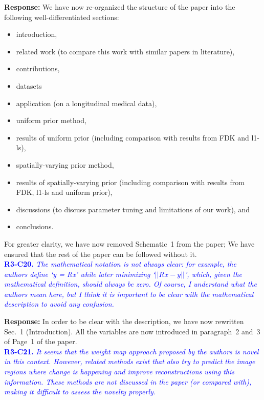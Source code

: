 \documentclass{article}
\begin{document}
\textbf{Response:} We have now re-organized the structure of the paper into the following well-differentiated sections:
\begin{itemize}
  
\item introduction, 
\item related work (to compare this work with similar papers in literature), 
\item contributions,
\item datasets
\item application (on a longitudinal medical data), 
\item uniform prior method, 
\item results of uniform prior (including comparison with results from FDK and l1-ls), 
\item spatially-varying prior method, 
\item results of spatially-varying prior (including comparison with results from FDK, l1-ls and uniform prior), 
\item discussions (to discuss parameter tuning and limitations of our work), and 
  \item conclusions.
  \end{itemize}
For greater clarity, we have now removed Schematic~1 from the paper; We have  ensured that the rest of the paper can be followed without it.\\

\textcolor{blue}{\textbf{R3-C20.}\textit{ The mathematical notation is not always clear: for example, the authors define `y = Rx' while later minimizing `$||Rx-y||$', which, given the mathematical definition, should always be zero. Of course, I understand what the authors mean here, but I think it is important to be clear with the mathematical description to avoid any confusion.}}


\textbf{Response:} In order to be clear with the description, we have now rewritten Sec.~1 (Introduction). All the variables are now introduced in paragraph~2 and~3 of Page~1 of the paper.\\

\textcolor{blue}{\textbf{R3-C21.}\textit{ It seems that the weight map approach proposed by the authors is novel in this context. However, related methods exist that also try to predict the image regions where change is happening and improve reconstructions using this information. These methods are not discussed in the paper (or compared with), making it difficult to assess the novelty properly.}}
\end{document}
